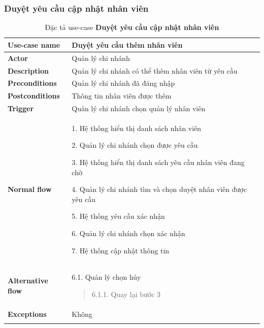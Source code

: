 \subsubsection{Duyệt yêu cầu cập nhật nhân viên}
{
    \setlength\extrarowheight{6pt}
    \begin{longtable}{| p{} | p{} |}
        \hline
        \textbf{Use-case name}
         &
        Duyệt yêu cầu thêm nhân viên
        \\
        \hline
        \textbf{Actor}
         &
        Quản lý chi nhánh
        \\
        \hline
        \textbf{Description}
         &
        Quản lý chi nhánh có thể thêm nhân viên từ yêu cầu
        \\
        \hline
        \textbf{Preconditions}
         &
        Quản lý chi nhánh đã đăng nhập
        \\
        \hline
        \textbf{Postconditions}
         &
        Thông tin nhân viên được thêm
        \\
        \hline
        \textbf{Trigger}
         &
        Quản lý chi nhánh chọn quản lý nhân viên
        \\
        \hline
        \begin{flushleft}
            \textbf{Normal flow}
        \end{flushleft}
         &
        1. Hệ thống hiển thị danh sách nhân viên

        2. Quản lý chi nhánh chọn được yêu cầu

        3. Hệ thống hiển thị danh sách yêu cầu nhân viên đang chờ

        4. Quản lý chi nhánh tìm và chọn duyệt nhân viên được yêu cầu

        5. Hệ thống yêu cầu xác nhận

        6. Quản lý chi nhánh chọn xác nhận

        7. Hệ thống cập nhật thông tin
        \\
        \hline
        \textbf{Alternative flow}
         &
        6.1. Quản lý chọn hủy
        \begin{quote}
            6.1.1. Quay lại bước 3
        \end{quote}
        \\
        \hline
        \textbf{Exceptions}
         &
        Không
        \\
        \hline
        \caption{Đặc tả use-case \textbf{Duyệt yêu cầu cập nhật nhân viên}}
    \end{longtable}
}



